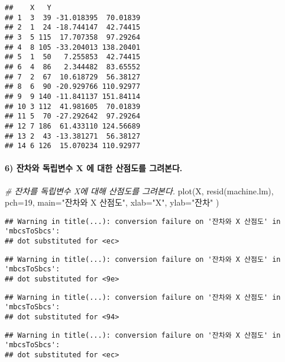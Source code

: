 \documentclass[
]{article}
\newenvironment{Shaded}{\begin{snugshade}}{\end{snugshade}}
\newcommand{\AttributeTok}[1]{\textcolor[rgb]{0.77,0.63,0.00}{#1}}
\newcommand{\CommentTok}[1]{\textcolor[rgb]{0.56,0.35,0.01}{\textit{#1}}}
\newcommand{\DecValTok}[1]{\textcolor[rgb]{0.00,0.00,0.81}{#1}}
\newcommand{\FunctionTok}[1]{\textcolor[rgb]{0.00,0.00,0.00}{#1}}
\newcommand{\NormalTok}[1]{#1}
\newcommand{\StringTok}[1]{\textcolor[rgb]{0.31,0.60,0.02}{#1}}
\begin{document}
\begin{verbatim}
##    X   Y                     
## 1  3  39 -31.018395  70.01839
## 2  1  24 -18.744147  42.74415
## 3  5 115  17.707358  97.29264
## 4  8 105 -33.204013 138.20401
## 5  1  50   7.255853  42.74415
## 6  4  86   2.344482  83.65552
## 7  2  67  10.618729  56.38127
## 8  6  90 -20.929766 110.92977
## 9  9 140 -11.841137 151.84114
## 10 3 112  41.981605  70.01839
## 11 5  70 -27.292642  97.29264
## 12 7 186  61.433110 124.56689
## 13 2  43 -13.381271  56.38127
## 14 6 126  15.070234 110.92977
\end{verbatim}

\hypertarget{uxc794uxcc28uxc640-uxb3c5uxb9bduxbcc0uxc218-x-uxc5d0-uxb300uxd55c-uxc0b0uxc810uxb3c4uxb97c-uxadf8uxb824uxbcf8uxb2e4.}{%
\paragraph{6) 잔차와 독립변수 X 에 대한 산점도를
그려본다.}\label{uxc794uxcc28uxc640-uxb3c5uxb9bduxbcc0uxc218-x-uxc5d0-uxb300uxd55c-uxc0b0uxc810uxb3c4uxb97c-uxadf8uxb824uxbcf8uxb2e4.}}

\begin{Shaded}
\begin{Highlighting}[]
\CommentTok{\# 잔차를 독립변수 X에 대해 산점도를 그려본다.}
\FunctionTok{plot}\NormalTok{(X, }\FunctionTok{resid}\NormalTok{(machine.lm), }\AttributeTok{pch=}\DecValTok{19}\NormalTok{, }\AttributeTok{main=}\StringTok{"잔차와 X 산점도"}\NormalTok{, }\AttributeTok{xlab=}\StringTok{"X"}\NormalTok{, }\AttributeTok{ylab=}\StringTok{"잔차"}\NormalTok{ )}
\end{Highlighting}
\end{Shaded}

\begin{verbatim}
## Warning in title(...): conversion failure on '잔차와 X 산점도' in 'mbcsToSbcs':
## dot substituted for <ec>
\end{verbatim}

\begin{verbatim}
## Warning in title(...): conversion failure on '잔차와 X 산점도' in 'mbcsToSbcs':
## dot substituted for <9e>
\end{verbatim}

\begin{verbatim}
## Warning in title(...): conversion failure on '잔차와 X 산점도' in 'mbcsToSbcs':
## dot substituted for <94>
\end{verbatim}

\begin{verbatim}
## Warning in title(...): conversion failure on '잔차와 X 산점도' in 'mbcsToSbcs':
## dot substituted for <ec>
\end{verbatim}
\end{document}
